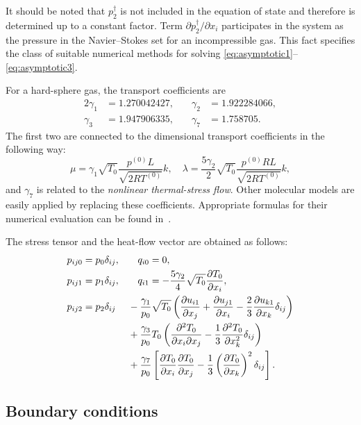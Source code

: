 \documentclass[smallextended, referee]{svjour3} %
\newcommand{\pder}[2][]{\frac{\partial#1}{\partial#2}}
\newcommand{\pderdual}[2][]{\frac{\partial^2#1}{\partial#2^2}}
\newcommand{\pderder}[3][]{\frac{\partial^2#1}{\partial#2\partial#3}}
\newcommand{\Pder}[2][]{\partial#1/\partial#2}
\begin{document}
It should be noted that \(p_2^\dag\) is not included in the equation of state and
therefore is determined up to a constant factor.
Term \(\Pder[p_2^\dag]{x_i}\) participates in the system as the pressure
in the Navier--Stokes set for an incompressible gas.
This fact specifies the class of suitable numerical methods
for solving \eqref{eq:asymptotic1}--\eqref{eq:asymptotic3}.

For a hard-sphere gas, the transport coefficients are
\begin{alignat*}{2}
    \gamma_1 &= 1.270042427, &\quad \gamma_2 &= 1.922284066, \\
    \gamma_3 &= 1.947906335, &\quad \gamma_7 &= 1.758705.
\end{alignat*}
The first two are connected to the dimensional transport coefficients in the following way:
\begin{equation}
    \mu = \gamma_1\sqrt{T_0} \frac{p^{(0)}L}{\sqrt{2RT^{(0)}}} k, \quad
    \lambda = \frac{5\gamma_2}{2}\sqrt{T_0} \frac{p^{(0)}RL}{\sqrt{2RT^{(0)}}} k,
\end{equation}
and \(\gamma_7\) is related to the \emph{nonlinear thermal-stress flow}.
Other molecular models are easily applied by replacing these coefficients.
Appropriate formulas for their numerical evaluation can be found in~\cite{SoneBobylev96, Sone2002, Sone2007}.

The stress tensor and the heat-flow vector are obtained as follows:
\begin{alignat}{2}
    p_{ij0} &= p_0\delta_{ij}, && \quad q_{i0} = 0, \label{eq:stress0}\\
    p_{ij1} &= p_1\delta_{ij}, && \quad q_{i1} = -\frac{5\gamma_2}4\sqrt{T_0}\pder[T_0]{x_i}, \label{eq:stress1}\\
    p_{ij2} &= p_2\delta_{ij}
                &&- \frac{\gamma_1}{p_0}\sqrt{T_0}\left(
                \pder[u_{i1}]{x_j} + \pder[u_{j1}]{x_i} - \frac23\pder[u_{k1}]{x_k}\delta_{ij}
            \right) \notag\\
        & &&+ \frac{\gamma_3}{p_0} T_0\left(
                \pderder[T_0]{x_i}{x_j} - \frac13\pderdual[T_0]{x_k}\delta_{ij}
            \right) \notag\\
        & &&+ \frac{\gamma_7}{p_0}\left[
                \pder[T_0]{x_i}\pder[T_0]{x_j} - \frac13\left(\pder[T_0]{x_k}\right)^2\delta_{ij}
            \right]. \label{eq:stress2}
\end{alignat}

\subsection{Boundary conditions}
\end{document}

